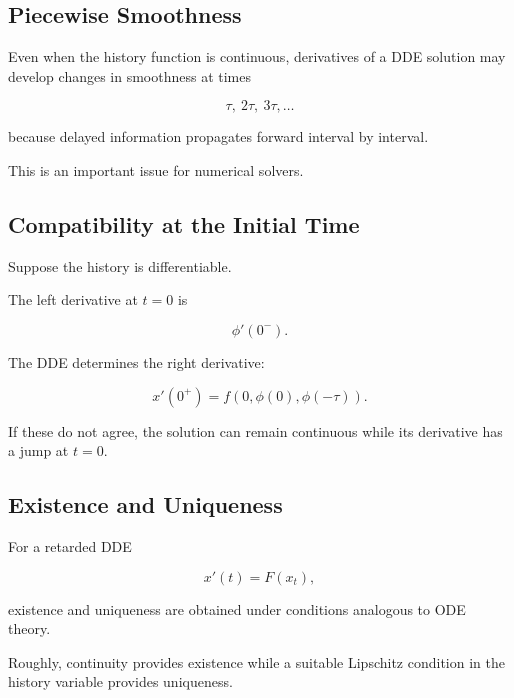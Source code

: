 \subsection{Piecewise Smoothness}
\label{subsec:dde-piecewise-smoothness}

Even when the history function is continuous, derivatives of a DDE
solution may develop changes in smoothness at times

\[
\boxed{
\tau,
\ 2\tau,
\ 3\tau,
\ldots
}
\]

because delayed information propagates forward interval by interval.

This is an important issue for numerical solvers.

\subsection{Compatibility at the Initial Time}
\label{subsec:dde-initial-compatibility}

Suppose the history is differentiable.

The left derivative at \(t=0\) is

\[
\phi'(0^-).
\]

The DDE determines the right derivative:

\[
\boxed{
x'(0^+)
=
f
\left(
0,
\phi(0),
\phi(-\tau)
\right).
}
\]

If these do not agree, the solution can remain continuous while its
derivative has a jump at \(t=0\).

\subsection{Existence and Uniqueness}
\label{subsec:dde-existence-uniqueness}

For a retarded DDE

\[
x'(t)=F(x_t),
\]

existence and uniqueness are obtained under conditions analogous to ODE
theory.

Roughly, continuity provides existence while a suitable Lipschitz
condition in the history variable provides uniqueness.

